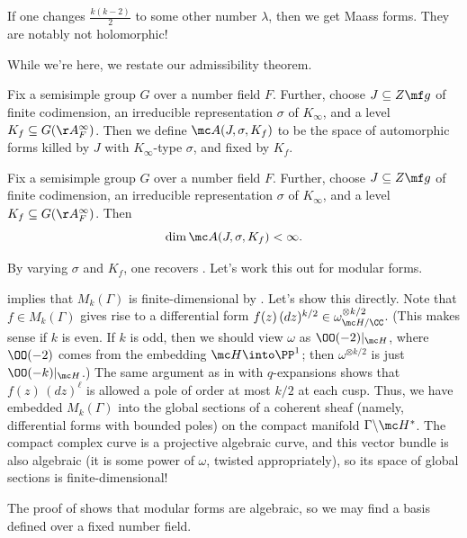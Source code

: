 \documentclass[../notes.tex]{subfiles}
\begin{document}
\begin{remark}
	If one changes $\frac{k(k-2)}2$ to some other number $\lambda$, then we get Maass forms. They are notably not holomorphic!
\end{remark}
While we're here, we restate our admissibility theorem.
\begin{notation}
	Fix a semisimple group $G$ over a number field $F$. Further, choose $J\subseteq Z\mf g$ of finite codimension, an irreducible representation $\sigma$ of $K_\infty$, and a level $K_f\subseteq G(\AA_F^\infty)$. Then we define $\mc A(J,\sigma,K_f)$ to be the space of automorphic forms killed by $J$ with $K_\infty$-type $\sigma$, and fixed by $K_f$.
\end{notation}
\begin{theorem} \label{thm:hc-admissible-automorphic}
	Fix a semisimple group $G$ over a number field $F$. Further, choose $J\subseteq Z\mf g$ of finite codimension, an irreducible representation $\sigma$ of $K_\infty$, and a level $K_f\subseteq G(\AA_F^\infty)$. Then
	\[\dim\mc A(J,\sigma,K_f)<\infty.\]
\end{theorem}
By varying $\sigma$ and $K_f$, one recovers . Let's work this out for modular forms.
\begin{example} \label{ex:dim-mod-form}
	 implies that $M_k(\Gamma)$ is finite-dimensional by . Let's show this directly. Note that $f\in M_k(\Gamma)$ gives rise to a differential form $f(z)\,(dz)^{k/2}\in\omega_{\mc H/\CC}^{\otimes k/2}$. (This makes sense if $k$ is even. If $k$ is odd, then we should view $\omega$ as $\OO(-2)|_{\mc H}$, where $\OO(-2)$ comes from the embedding $\mc H\into\PP^1$; then $\omega^{\otimes k/2}$ is just $\OO(-k)|_{\mc H}$.) The same argument as in  with $q$-expansions shows that $f(z)\,(dz)^\ell$ is allowed a pole of order at most $k/2$ at each cusp. Thus, we have embedded $M_k(\Gamma)$ into the global sections of a coherent sheaf (namely, differential forms with bounded poles) on the compact manifold $\Gamma\backslash\mc H^*$. The compact complex curve is a projective algebraic curve, and this vector bundle is also algebraic (it is some power of $\omega$, twisted appropriately), so its space of global sections is finite-dimensional!
\end{example}
\begin{remark}
	The proof of  shows that modular forms are algebraic, so we may find a basis defined over a fixed number field.
\end{remark}
\end{document}
